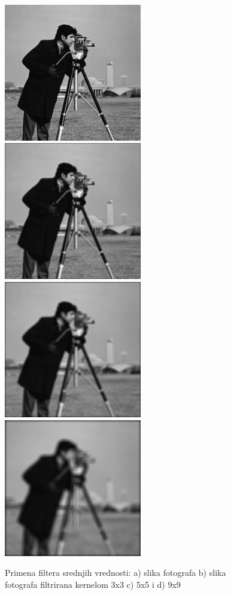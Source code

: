\documentclass[a4paper,12pt,titlepage]{article}
\begin{document}
\begin{figure}[ht!]
\centering
\includegraphics[width=60mm]{img/img.png}
\includegraphics[width=60mm]{img/imgAvg3.png}
\includegraphics[width=60mm]{img/imgAvg5.png}
\includegraphics[width=60mm]{img/imgAvg9.png}
\caption{Primena filtera srednjih vrednosti: a) slika fotografa b) slika fotografa filtrirana kernelom 3x3 c) 5x5 i d) 9x9}
\label{averageFilter}
\end{figure}
\end{document}
